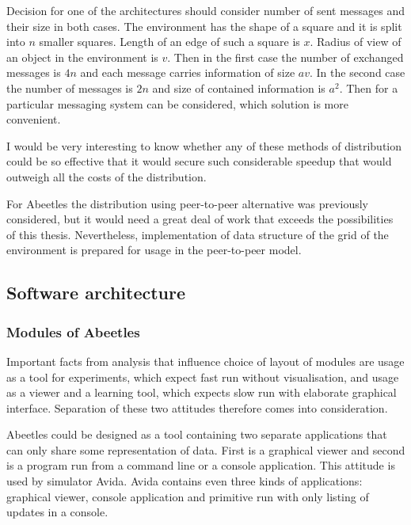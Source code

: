 \documentclass[a4paper,12pt]{report}
\begin{document}
Decision for one of the architectures should consider number of sent messages and their size in both cases. The environment has the shape of a square and it is split into $n$ smaller squares. Length of an edge of such a square is $x$. Radius of view of an object in the environment is $v$. Then in the first case the number of exchanged messages is $4n$ and each message carries information of size $av$. In the second case the number of messages is $2n$ and size of contained information is $a^2$. Then for a particular messaging system can be considered, which solution is more convenient.  


I would be very interesting to know whether any of these methods of distribution could be so effective that it would secure such considerable speedup that would outweigh all the costs of the distribution.

For Abeetles the distribution using peer-to-peer alternative was previously considered, but it would need a great deal of work that exceeds the possibilities of this thesis. Nevertheless, implementation of data structure of the grid of the environment is prepared for usage in the peer-to-peer model. 


\subsection {Software architecture}
\subsubsection {Modules of Abeetles}
Important facts from analysis that influence choice of layout of modules are usage as a tool for experiments, which expect fast run without visualisation, and usage as a viewer and a learning tool, which expects slow run with elaborate graphical interface. Separation of these two attitudes therefore comes into consideration.

Abeetles could be designed as a tool containing two separate applications that can only share some representation of data. First is a graphical viewer and second is a program run from a command line or a console application. This attitude is used by simulator Avida. Avida contains even three kinds of applications: graphical viewer, console application and primitive run with only listing of updates in a console.
\end{document}
